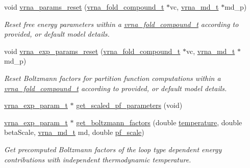 \begin{DoxyCompactItemize}
void \mbox{\hyperlink{group__energy__parameters_gac40dc82e48a72a97cfc58b9da08a7792}{vrna\+\_\+params\+\_\+reset}} (\mbox{\hyperlink{group__fold__compound_ga1b0cef17fd40466cef5968eaeeff6166}{vrna\+\_\+fold\+\_\+compound\+\_\+t}} $\ast$vc, \mbox{\hyperlink{group__model__details_ga1f8a10e12a0a1915f2a4eff0b28ea17c}{vrna\+\_\+md\+\_\+t}} $\ast$md\+\_\+p)
\begin{DoxyCompactList}\small\item\em Reset free energy parameters within a \mbox{\hyperlink{group__fold__compound_ga1b0cef17fd40466cef5968eaeeff6166}{vrna\+\_\+fold\+\_\+compound\+\_\+t}} according to provided, or default model details. \end{DoxyCompactList}\item 
void \mbox{\hyperlink{group__energy__parameters_gaa5409218068be84d7b50c78fbdaa85a9}{vrna\+\_\+exp\+\_\+params\+\_\+reset}} (\mbox{\hyperlink{group__fold__compound_ga1b0cef17fd40466cef5968eaeeff6166}{vrna\+\_\+fold\+\_\+compound\+\_\+t}} $\ast$vc, \mbox{\hyperlink{group__model__details_ga1f8a10e12a0a1915f2a4eff0b28ea17c}{vrna\+\_\+md\+\_\+t}} $\ast$md\+\_\+p)
\begin{DoxyCompactList}\small\item\em Reset Boltzmann factors for partition function computations within a \mbox{\hyperlink{group__fold__compound_ga1b0cef17fd40466cef5968eaeeff6166}{vrna\+\_\+fold\+\_\+compound\+\_\+t}} according to provided, or default model details. \end{DoxyCompactList}\item 
\mbox{\hyperlink{group__energy__parameters_ga01d8b92fe734df8d79a6169482c7d8d8}{vrna\+\_\+exp\+\_\+param\+\_\+t}} $\ast$ \mbox{\hyperlink{group__energy__parameters_gabf3b9271c41dd3fac02d56e0b02b3344}{get\+\_\+scaled\+\_\+pf\+\_\+parameters}} (void)
\item 
\mbox{\hyperlink{group__energy__parameters_ga01d8b92fe734df8d79a6169482c7d8d8}{vrna\+\_\+exp\+\_\+param\+\_\+t}} $\ast$ \mbox{\hyperlink{group__energy__parameters_gaef2b931c7e9d4ffb0a5c33df50ec2068}{get\+\_\+boltzmann\+\_\+factors}} (double \mbox{\hyperlink{group__model__details_gab4b11c8d9c758430960896bc3fe82ead}{temperature}}, double beta\+Scale, \mbox{\hyperlink{group__model__details_ga1f8a10e12a0a1915f2a4eff0b28ea17c}{vrna\+\_\+md\+\_\+t}} md, double \mbox{\hyperlink{group__model__details_gad3b22044065acc6dee0af68931b52cfd}{pf\+\_\+scale}})
\begin{DoxyCompactList}\small\item\em Get precomputed Boltzmann factors of the loop type dependent energy contributions with independent thermodynamic temperature. \end{DoxyCompactList}\item 

\end{DoxyCompactItemize}
